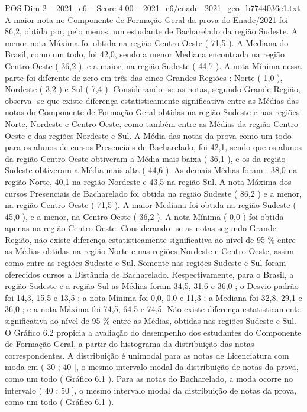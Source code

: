 \begin{textsample}{POS Dim 2 – 2021\_c6 – Score 4.00 – 2021\_c6/enade\_2021\_geo\_b7744036e1.txt}
A maior nota no Componente de Formação Geral da prova do Enade/2021 foi 86,2, obtida por, pelo menos, um estudante de Bacharelado da região Sudeste.
A menor nota Máxima foi obtida na região Centro-Oeste ( 71,5 ).
A Mediana do Brasil, como um todo, foi 42,0, sendo a menor Mediana encontrada na região Centro-Oeste ( 36,2 ), e a maior, na região Sudeste ( 44,7 ).
A nota Mínima nessa parte foi diferente de zero em três das cinco Grandes Regiões : Norte ( 1,0 ), Nordeste ( 3,2 ) e Sul ( 7,4 ).
Considerando -se as notas, segundo Grande Região, observa -se que existe diferença estatisticamente significativa entre as Médias das notas do Componente de Formação Geral obtidas na região Sudeste e nas regiões Norte, Nordeste e Centro-Oeste, como também entre as Médias da região Centro-Oeste e das regiões Nordeste e Sul.
A Média das notas da prova como um todo para os alunos de cursos Presenciais de Bacharelado, foi 42,1, sendo que os alunos da região Centro-Oeste obtiveram a Média mais baixa ( 36,1 ), e os da região Sudeste obtiveram a Média mais alta ( 44,6 ).
As demais Médias foram : 38,0 na região Norte, 40,1 na região Nordeste e 43,5 na região Sul.
A nota Máxima dos cursos Presenciais de Bacharelado foi obtida na região Sudeste ( 86,2 ) e a menor, na região Centro-Oeste ( 71,5 ).
A maior Mediana foi obtida na região Sudeste ( 45,0 ), e a menor, na Centro-Oeste ( 36,2 ).
A nota Mínima ( 0,0 ) foi obtida apenas na região Centro-Oeste.
Considerando -se as notas segundo Grande Região, não existe diferença estatisticamente significativa ao nível de 95 \% entre as Médias obtidas na região Norte e nas regiões Nordeste e Centro-Oeste, assim como entre as regiões Sudeste e Sul.
Somente nas regiões Sudeste e Sul foram oferecidos cursos a Distância de Bacharelado.
Respectivamente, para o Brasil, a região Sudeste e a região Sul as Médias foram 34,5, 31,6 e 36,0 ; o Desvio padrão foi 14,3, 15,5 e 13,5 ; a nota Mínima foi 0,0, 0,0 e 11,3 ; a Mediana foi 32,8, 29,1 e 36,0 ; e a nota Máxima foi 74,5, 64,5 e 74,5.
Não existe diferença estatisticamente significativa ao nível de 95 \% entre as Médias, obtidas nas regiões Sudeste e Sul.
O Gráfico 6.2 propicia a avaliação do desempenho dos estudantes do Componente de Formação Geral, a partir do histograma da distribuição das notas correspondentes.
A distribuição é unimodal para as notas de Licenciatura com moda em ( 30 ; 40 ], o mesmo intervalo modal da distribuição de notas da prova, como um todo ( Gráfico 6.1 ).
Para as notas do Bacharelado, a moda ocorre no intervalo ( 40 ; 50 ], o mesmo intervalo modal da distribuição de notas da prova, como um todo ( Gráfico 6.1 ).

\end{textsample}
